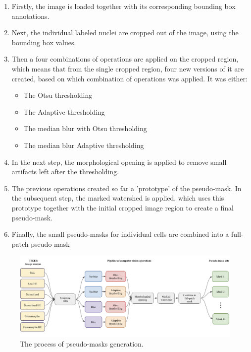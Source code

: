 \begin{enumerate}
    \item Firstly, the image is loaded together with its corresponding bounding box annotations.
    \item Next, the individual labeled nuclei are cropped out of the image, using the bounding box values.
    \item Then a four combinations of operations are applied on the cropped region, which means that from the single cropped region, four new versions of it are created, based on which combination of operations was applied. It was either:
    \begin{itemize}
        \item The Otsu thresholding
        \item The Adaptive thresholding
        \item The median blur with Otsu thresholding
        \item The median blur Adaptive thresholding
    \end{itemize}
    \item In the next step, the morphological opening is applied to remove small artifacts left after the thresholding.
    \item The previous operations created so far a 'prototype' of the pseudo-mask. In the subsequent step, the marked watershed is applied, which uses this prototype together with the initial cropped image region to create a final pseudo-mask.
    \item Finally, the small pseudo-masks for individual cells are combined into a full-patch pseudo-mask
\end{enumerate}

\begin{figure}[H]
\begin{centering}
\includegraphics[width=\textwidth]{assets/images/for_presentation/dg-mask-gen.png}
\par\end{centering}
\caption{The process of pseudo-masks generation. 
\label{fig:dg-mask-gen}}
\end{figure}


